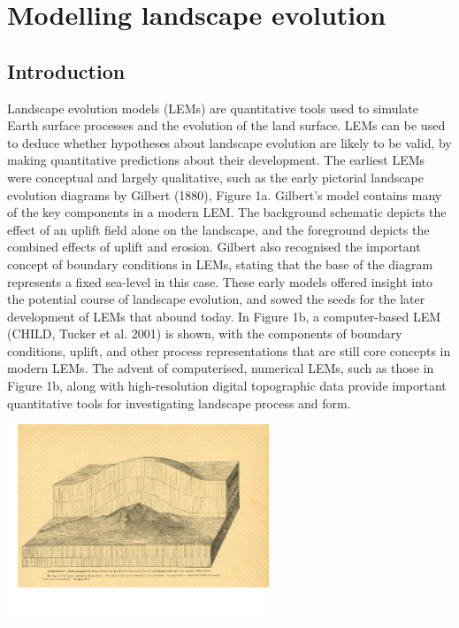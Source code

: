 \chapter{Modelling landscape evolution}
\label{chapter_landscape_evol}

\section{Introduction}
Landscape evolution models (LEMs) are quantitative tools used to simulate Earth surface processes and the evolution of the land surface. LEMs can be used to deduce whether hypotheses about landscape evolution are likely to be valid, by making quantitative predictions about their development. The earliest LEMs were conceptual and largely qualitative, such as the early pictorial landscape evolution diagrams by Gilbert (1880), Figure 1a. Gilbert’s model contains many of the key components in a modern LEM. The background schematic depicts the effect of an uplift field alone on the landscape, and the foreground depicts the combined effects of uplift and erosion. Gilbert also recognised the important concept of boundary conditions in LEMs, stating that the base of the diagram represents a fixed sea-level in this case.  These early models offered insight into the potential course of landscape evolution, and sowed the seeds for the later development of LEMs that abound today. In Figure 1b, a computer-based LEM (CHILD, Tucker et al. 2001) is shown, with the components of boundary conditions, uplift, and other process representations that are still core concepts in modern LEMs. The advent of computerised, numerical LEMs, such as those in Figure 1b, along with high-resolution digital topographic data provide important quantitative tools for investigating landscape process and form. 

\includegraphics[width=7.86cm]{LEMFinalRevisedmanuscriptDAVFinalrevisions-img/LEMFinalRevisedmanuscriptDAVFinalrevisions-img001.png} 

